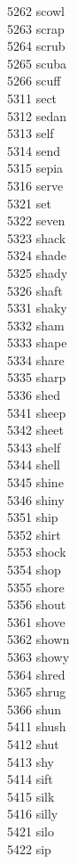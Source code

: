 5262 scowl \\
5263 scrap \\
5264 scrub \\
5265 scuba \\
5266 scuff \\
5311 sect \\
5312 sedan \\
5313 self \\
5314 send \\
5315 sepia \\
5316 serve \\
5321 set \\
5322 seven \\
5323 shack \\
5324 shade \\
5325 shady \\
5326 shaft \\
5331 shaky \\
5332 sham \\
5333 shape \\
5334 share \\
5335 sharp \\
5336 shed \\
5341 sheep \\
5342 sheet \\
5343 shelf \\
5344 shell \\
5345 shine \\
5346 shiny \\
5351 ship \\
5352 shirt \\
5353 shock \\
5354 shop \\
5355 shore \\
5356 shout \\
5361 shove \\
5362 shown \\
5363 showy \\
5364 shred \\
5365 shrug \\
5366 shun \\
5411 shush \\
5412 shut \\
5413 shy \\
5414 sift \\
5415 silk \\
5416 silly \\
5421 silo \\
5422 sip \\
